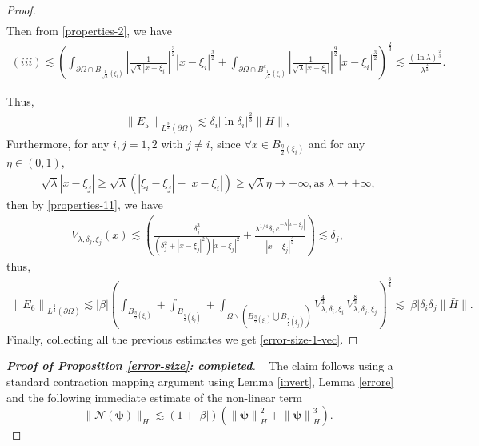 \documentclass[a4paper,reqno,11pt,oneside]{amsart}
\numberwithin{equation}{section}
\begin{document}
\begin{proof}
\begin{align*}
\end{align*}
Then from \eqref{properties-2}, we have
\begin{align*}
(iii)\lesssim{\!\left(\!\displaystyle{\int_{\partial\Omega\cap B_{\frac{1}{\sqrt{\lambda}}(\xi_i)}}}\left|{\frac{1}{\sqrt{\lambda}|x-\xi_i|}}\right|^{\frac{3}{2}}\!\left|x-\xi_i\right|^{\frac{3}{2}}+\displaystyle{\int_{\partial\Omega\cap B^c_{\frac{1}{\sqrt{\lambda}}(\xi_i)}}}\left|{\frac{1}{\sqrt{\lambda}|x-\xi_i|}}\right|^{\frac{9}{2}}\!\left|x-\xi_i\right|^{\frac{3}{2}}\right)^{\frac{2}{3}}}\!\lesssim\frac{\left(\ln{\lambda}\!\right)^{\frac{2}{3}}}{\lambda^{\frac{3}{2}}}.
\end{align*}

Thus, \begin{align*}
  \left\|E_5\right\|_{L^{\frac{3}{2}}(\partial\Omega)}  \lesssim \delta_i|\ln{\delta_i}|^{\frac{2}{3}}\|\bar H\|,
\end{align*}
Furthermore, for any $i,j=1,2$ with $j\neq i$, since $\forall x\in B_{\frac{\eta}{2}(\xi_i)}$ and for any $\eta\in (0,1)$, \begin{align*}
    \sqrt{\lambda}|x-\xi_j|\geq\sqrt{\lambda}\left(\left|\xi_i-\xi_j\right|-|x-\xi_i|\right)\geq \sqrt{\lambda}\eta\to+\infty, \text{as $\lambda\to +\infty$,} 
\end{align*} then by \eqref{properties-11}, we have\begin{align}\label{v-prop}
    V_{\lambda,\delta_j,\xi_j}(x)\lesssim\left(\frac{\delta_j^3}{(\delta_j^2+|x-\xi_j|^2)|x-\xi_j|^2}+\frac{{\lambda}^{1/4}\delta_j\,e^{-\lambda|x-\xi_j|}}{|x-\xi_j|^{\frac{3}{2}}}\right)\lesssim\delta_j,
\end{align}
thus,
\begin{align*}
    \left\|E_6\right\|_{L^{\frac{3}{2}}(\partial\Omega)}\lesssim|\beta|\left(\displaystyle\int_{B_{\frac{\eta}{2}(\xi_i)}}+\displaystyle\int_{B_{\frac{\eta}{2}(\xi_j)}}+\displaystyle\int_{\Omega\backslash(B_{\frac{\eta}{2}(\xi_i)}\bigcup B_{\frac{\eta}{2}(\xi_j)})}V_{\lambda,\delta_i,\xi_i}^{\frac{4}{3}}\,V_{\lambda,\delta_j,\xi_j}^{\frac{8}{3}}\right)^{\frac{3}{4}}\lesssim|\beta|\delta_i\delta_j\|\bar H\|.
\end{align*}
Finally, collecting all the previous estimates we get \eqref{error-size-1-vec}.
\end{proof}

\begin{proof}[\textbf{Proof of Proposition \ref{error-size}: completed}]~
The claim follows using a standard contraction mapping argument using Lemma \ref{invert}, Lemma \ref{errore}  and the following immediate estimate of the non-linear term
$$ \| \bm{\mathcal{N}}(\bm{\psi}) \|_{H} \lesssim \left(1+|\beta|\right)\left(\left\|{\bm{\psi}}\right\|_H^2+\left\|{\bm{\psi}}\right\|_H^3\right).$$
\end{proof}
\end{document}
